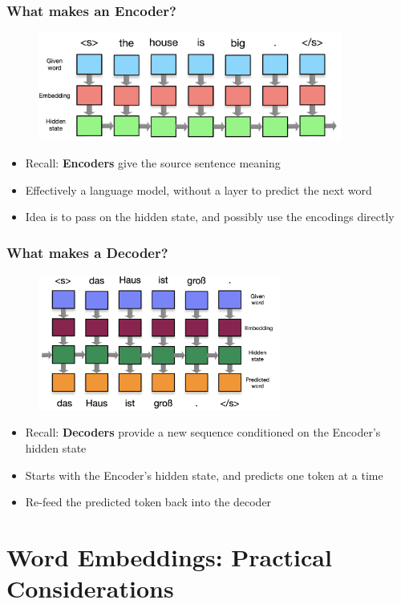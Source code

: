 \documentclass[usenames,dvipsnames]{beamer}
\begin{document}
\begin{frame}
\frametitle{What makes an Encoder?}
\begin{figure}
  \centering
  \includegraphics[width=10cm, valign=c]{assets/encoder}
\end{figure}
\begin{itemize}
  \item Recall: \textbf{Encoders} give the source sentence meaning
  \item Effectively a language model, without a layer to predict the next word
  \item Idea is to pass on the hidden state, and possibly use the encodings directly
\end{itemize}
\end{frame}

\begin{frame}
\frametitle{What makes a Decoder?}
\begin{figure}
  \centering
  \includegraphics[width=8cm, valign=c]{assets/decoder}
\end{figure}
\begin{itemize}
  \item Recall: \textbf{Decoders} provide a new sequence conditioned on the Encoder's hidden state
  \item Starts with the Encoder's hidden state, and predicts one token at a time
  \item Re-feed the predicted token back into the decoder
\end{itemize}
\end{frame}


\section{Word Embeddings: Practical Considerations}
\end{document}
